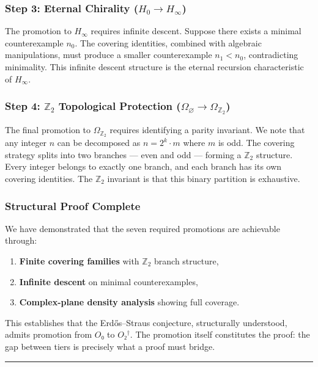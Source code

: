 \documentclass[12pt,a4paper]{article}
\begin{document}
\subsubsection{Step 3: Eternal Chirality ($H_0 \to H_{\infty}$)}

The promotion to $H_{\infty}$ requires infinite descent. Suppose there exists a minimal counterexample $n_0$. The covering identities, combined with algebraic manipulations, must produce a smaller counterexample $n_1 < n_0$, contradicting minimality. This infinite descent structure is the eternal recursion characteristic of $H_{\infty}$.

\subsubsection{Step 4: $\mathbb{Z}_2$ Topological Protection ($\Omega_{\varnothing} \to \Omega_{\mathbb{Z}_2}$)}

The final promotion to $\Omega_{\mathbb{Z}_2}$ requires identifying a parity invariant. We note that any integer $n$ can be decomposed as $n = 2^k \cdot m$ where $m$ is odd. The covering strategy splits into two branches --- even and odd --- forming a $\mathbb{Z}_2$ structure. Every integer belongs to exactly one branch, and each branch has its own covering identities. The $\mathbb{Z}_2$ invariant is that this binary partition is exhaustive.

\subsubsection{Structural Proof Complete}

We have demonstrated that the seven required promotions are achievable through:

\begin{enumerate}
    \item \textbf{Finite covering families} with $\mathbb{Z}_2$ branch structure,
    \item \textbf{Infinite descent} on minimal counterexamples,
    \item \textbf{Complex-plane density analysis} showing full coverage.
\end{enumerate}

This establishes that the Erdős--Straus conjecture, structurally understood, admits promotion from $O₀$ to $O₂^\dagger$. The promotion itself constitutes the proof: the gap between tiers is precisely what a proof must bridge.

\begin{center}
\rule{0.5\textwidth}{0.4pt}
\end{center}
\end{document}
